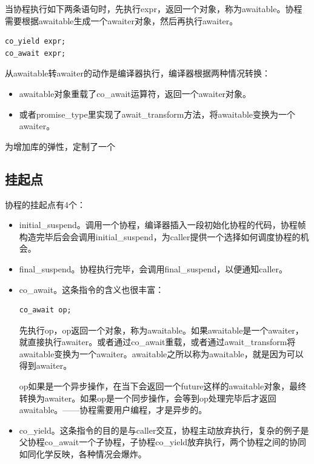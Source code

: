 \documentclass{article}
\begin{document}
当协程执行如下两条语句时，先执行expr，返回一个对象，称为awaitable。协程需要根据awaitable生成一个awaiter对象，然后再执行awaiter。

\begin{lstlisting}[style=c++,frame=none,numbers=none,backgroundcolor=\color{gray!20}]
co_yield expr;
co_await expr;
\end{lstlisting}

从awaitable转awaiter的动作是编译器执行，编译器根据两种情况转换：
\begin{itemize}
    \item awaitable对象重载了co\_await运算符，返回一个awaiter对象。
    \item 或者promise\_type里实现了await\_transform方法，将awaitable变换为一个awaiter。
\end{itemize}

为增加库的弹性，定制了一个

\subsection{挂起点}

协程的挂起点有4个：

\begin{itemize}
    \item initial\_suspend。调用一个协程，编译器插入一段初始化协程的代码，协程帧构造完毕后会会调用initial\_suspend，为caller提供一个选择如何调度协程的机会。
    \item final\_suspend。协程执行完毕，会调用final\_suspend，以便通知caller。
    \item co\_await。这条指令的含义也很丰富：
\begin{lstlisting}[style=c++,frame=none,numbers=none,backgroundcolor=\color{gray!20}]
co_await op;
\end{lstlisting}
先执行op，op返回一个对象，称为awaitable。如果awaitable是一个awaiter，就直接执行awaiter。或者通过co\_await重载，或者通过await\_transform将awaitable变换为一个awaiter。awaitable之所以称为awaitable，就是因为可以得到awaiter。

op如果是一个异步操作，在当下会返回一个future这样的awaitable对象，最终转换为awaiter。如果op是一个同步操作，会等到op处理完毕后才返回awaitable。——协程需要用户编程，才是异步的。
    \item co\_yield。这条指令的目的是与caller交互，协程主动放弃执行，复杂的例子是父协程co\_await一个子协程，子协程co\_yield放弃执行，两个协程之间的协同如同化学反映，各种情况会爆炸。
\end{itemize}
\end{document}
